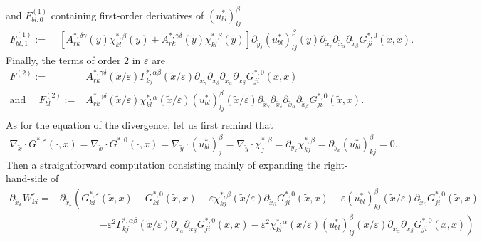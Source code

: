 \documentclass[11pt, reqno]{amsart}
\theoremstyle{definition}
\theoremstyle{remark}
\numberwithin{equation}{section}
\begin{document}
	and  $	F^{(1)}_{bl,0}$ containing first-order derivatives of $  (u^*_{bl})^{\beta}_{lj}$
	\begin{align*}
		F^{(1)}_{bl,1}:=\;		
		& [A^{*,\delta\gamma}_{rk}(\tilde{y})	\chi^{*,\beta}_{kl}(\tilde{y}) + A^{*,\gamma\delta}_{rk}(\tilde{y})\chi^{*,\beta}_{kl}(\tilde{y})]\partial_{\tilde{y}_\delta}(u^*_{bl})^{\beta}_{lj}(\tilde{y}) \partial_{\tilde{x}_\gamma}\partial_{ \tilde{x}_{\alpha}} \partial_{\tilde{x}_{\beta}} G_{ji}^{*,0}  (\tilde{x},x).
	\end{align*}
	Finally, the terms of order 2 in $\varepsilon$ are 
	\begin{align}
		F^{(2)}:=&	  A^{*,\gamma\delta}_{rk}(\tilde{x}/\varepsilon)\Gamma^{*,\alpha\beta}_{kj}(\tilde{x}/\varepsilon)\partial_{\tilde{x}_\gamma}\partial_{\tilde{x}_\delta}\partial_{ \tilde{x}_{\alpha}} \partial_{\tilde{x}_{\beta}} G_{ji}^{*,0}  (\tilde{x},x)\label{F2}\\
		\mbox{and }\quad 	F^{(2)}_{bl}:=	&   A^{*,\gamma\delta}_{rk}(\tilde{x}/\varepsilon) \chi^{*,\alpha}_{kl}(\tilde{x}/\varepsilon)(u^*_{bl})^{\beta}_{lj}	(\tilde{x}/\varepsilon)	\partial_{\tilde{x}_\gamma}\partial_{\tilde{x}_\delta}\partial_{ \tilde{x}_{\alpha}}\partial_{\tilde{x}_{\beta}} G_{ji}^{*,0}  (\tilde{x},x).\label{F2bl}\\\nonumber
	\end{align}
	As for  the equation of the divergence, let us first remind that 
	\begin{align*}
		\nabla_{\tilde{x}} \cdot G^{*,\varepsilon}(\cdot,x)=\nabla_{\tilde{x}}  \cdot G^{*,0}(\cdot,x)=\nabla_{\tilde{y}} \cdot (u^*_{bl})^{\beta}_{j} =\nabla_{\tilde{y}} \cdot \chi^{*,\beta}_{j}= \partial_{y_k} \chi^{*,\beta}_{kj}= \partial_{y_k} (u^*_{bl})^{\beta}_{kj}=0.
	\end{align*}
	Then a straightforward computation consisting mainly of expanding the right-hand-side of
	\begin{align*}
		\partial_{\tilde{x}_k} W_{ki}^{\varepsilon}=& 	\partial_{\tilde{x}_k}  \left( G_{ki}^{*,\varepsilon} (\tilde{x},x) -  G_{ki}^{*,0} (\tilde{x},x)-\varepsilon	\chi^{*,\beta}_{kj}(\tilde{x}/\varepsilon)\partial_{\tilde{x}_{\beta}} G_{ji}^{*,0}  (\tilde{x},x) -\varepsilon	(u^*_{bl})^{\beta}_{kj}(\tilde{x}/\varepsilon)\partial_{\tilde{x}_{\beta}} G_{ji}^{*,0}  (\tilde{x},x)\right. \\
		&\qquad\qquad \left. - \varepsilon^2 \Gamma^{*,\alpha\beta}_{kj}(\tilde{x}/\varepsilon)\partial_{ \tilde{x}_{\alpha}}\partial_{\tilde{x}_{\beta}} G_{ji}^{*,0}  (\tilde{x},x) -\varepsilon^2	\chi^{*,\alpha}_{kl}(\tilde{x}/\varepsilon)(u^*_{bl})^{\beta}_{lj}	(\tilde{x}/\varepsilon)\partial_{ \tilde{x}_{\alpha}}\partial_{\tilde{x}_{\beta}} G_{ji}^{*,0}  (\tilde{x},x) \right)
	\end{align*}
\end{document}
